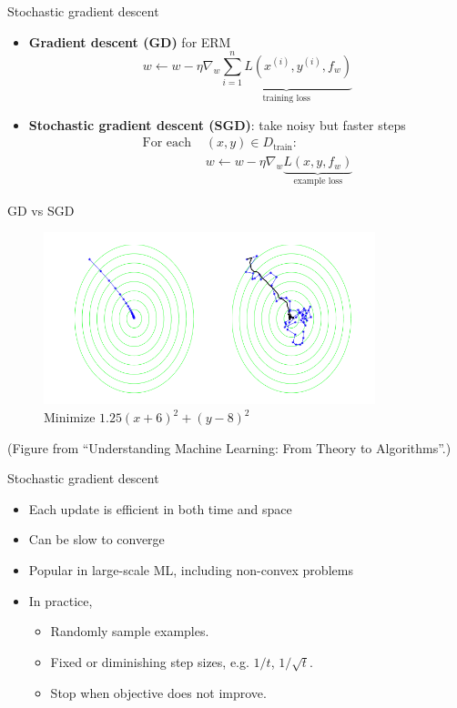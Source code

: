 \documentclass[usenames,dvipsnames,notes,11pt,aspectratio=169]{beamer}
\begin{document}
\begin{frame}
    {Stochastic gradient descent}
    \begin{itemize}
        \item \textbf{Gradient descent (GD)} for ERM
            $$
            w \leftarrow w - \eta\nabla_w \underbrace{\sum_{i=1}^n L(x^{(i)}, y^{(i)}, f_w)}_{\textstyle{\text{training loss}}}
            $$
            \pause
        \item \textbf{Stochastic gradient descent (SGD)}: take noisy but faster steps\\
            \begin{align*}
                \text{For each } &(x, y) \in D_{\text{train}}:\\
                &w \leftarrow w - \eta\nabla_w \underbrace{L(x, y, f_w)}_{\textstyle{\text{example loss}}}
            \end{align*}
    \end{itemize}
\end{frame}

\begin{frame}
    {GD vs SGD}
    \begin{figure}
        \caption{Minimize $1.25(x + 6)^2 + (y - 8)^2$}
        \includegraphics[height=5cm]{figures/gd-vs-sgd}
    \end{figure}
    (\small{Figure from ``Understanding Machine Learning: From Theory to Algorithms''.})
\end{frame}

\begin{frame}
    {Stochastic gradient descent}
    \begin{itemize}
        \itemsep1em
        \item Each update is efficient in both time and space
        \item Can be slow to converge 
        \item Popular in large-scale ML, including non-convex problems
        \item In practice, 
            \begin{itemize}
                \item[] Randomly sample examples.
                \item[] Fixed or diminishing step sizes, e.g. $1/t$, $1/\sqrt{t}$.
                \item[] Stop when objective does not improve.
            \end{itemize}
    \end{itemize}
\end{frame}
\end{document}
